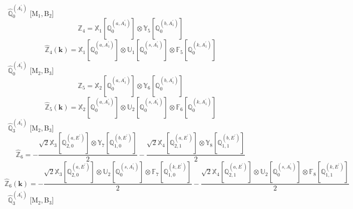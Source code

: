 \documentclass[fleqn,10pt,landscape]{article}
\begin{document}
\begin{itemize}
\vspace{4mm}
\noindent {} $\,\,\,\hat{\mathbb{Q}}_{0}^{(A_{1}^{\prime})}$ [M$_{1}$,\,B$_{2}$]
\begin{dmath*}
\hat{\mathbb{Z}}_{4}=\mathbb{X}_{1}[\mathbb{Q}_{0}^{(a,A_{1}^{\prime})}] \otimes\mathbb{Y}_{5}[\mathbb{Q}_{0}^{(b,A_{1}^{\prime})}]
\end{dmath*}
\begin{dmath*}
\hat{\mathbb{Z}}_{4}(\bm{k})=\mathbb{X}_{1}[\mathbb{Q}_{0}^{(a,A_{1}^{\prime})}] \otimes\mathbb{U}_{1}[\mathbb{Q}_{0}^{(s,A_{1}^{\prime})}] \otimes\mathbb{F}_{5}[\mathbb{Q}_{0}^{(k,A_{1}^{\prime})}]
\end{dmath*}
\vspace{4mm}
\noindent {} $\,\,\,\hat{\mathbb{Q}}_{0}^{(A_{1}^{\prime})}$ [M$_{2}$,\,B$_{3}$]
\begin{dmath*}
\hat{\mathbb{Z}}_{5}=\mathbb{X}_{2}[\mathbb{Q}_{0}^{(a,A_{1}^{\prime})}] \otimes\mathbb{Y}_{6}[\mathbb{Q}_{0}^{(b,A_{1}^{\prime})}]
\end{dmath*}
\begin{dmath*}
\hat{\mathbb{Z}}_{5}(\bm{k})=\mathbb{X}_{2}[\mathbb{Q}_{0}^{(a,A_{1}^{\prime})}] \otimes\mathbb{U}_{2}[\mathbb{Q}_{0}^{(s,A_{1}^{\prime})}] \otimes\mathbb{F}_{6}[\mathbb{Q}_{0}^{(k,A_{1}^{\prime})}]
\end{dmath*}
\vspace{4mm}
\noindent {} $\,\,\,\hat{\mathbb{Q}}_{3}^{(A_{1}^{\prime})}$ [M$_{2}$,\,B$_{3}$]
\begin{dmath*}
\hat{\mathbb{Z}}_{6}=- \frac{\sqrt{2} \mathbb{X}_{3}[\mathbb{Q}_{2,0}^{(a,E^{\prime})}] \otimes\mathbb{Y}_{7}[\mathbb{Q}_{1,0}^{(b,E^{\prime})}]}{2} - \frac{\sqrt{2} \mathbb{X}_{4}[\mathbb{Q}_{2,1}^{(a,E^{\prime})}] \otimes\mathbb{Y}_{8}[\mathbb{Q}_{1,1}^{(b,E^{\prime})}]}{2}
\end{dmath*}
\begin{dmath*}
\hat{\mathbb{Z}}_{6}(\bm{k})=- \frac{\sqrt{2} \mathbb{X}_{3}[\mathbb{Q}_{2,0}^{(a,E^{\prime})}] \otimes\mathbb{U}_{2}[\mathbb{Q}_{0}^{(s,A_{1}^{\prime})}] \otimes\mathbb{F}_{7}[\mathbb{Q}_{1,0}^{(k,E^{\prime})}]}{2} - \frac{\sqrt{2} \mathbb{X}_{4}[\mathbb{Q}_{2,1}^{(a,E^{\prime})}] \otimes\mathbb{U}_{2}[\mathbb{Q}_{0}^{(s,A_{1}^{\prime})}] \otimes\mathbb{F}_{8}[\mathbb{Q}_{1,1}^{(k,E^{\prime})}]}{2}
\end{dmath*}
\vspace{4mm}
\noindent {} $\,\,\,\hat{\mathbb{Q}}_{3}^{(A_{1}^{\prime})}$ [M$_{2}$,\,B$_{3}$]
\begin{dmath*}

\end{dmath*}
\end{itemize}
\end{document}
